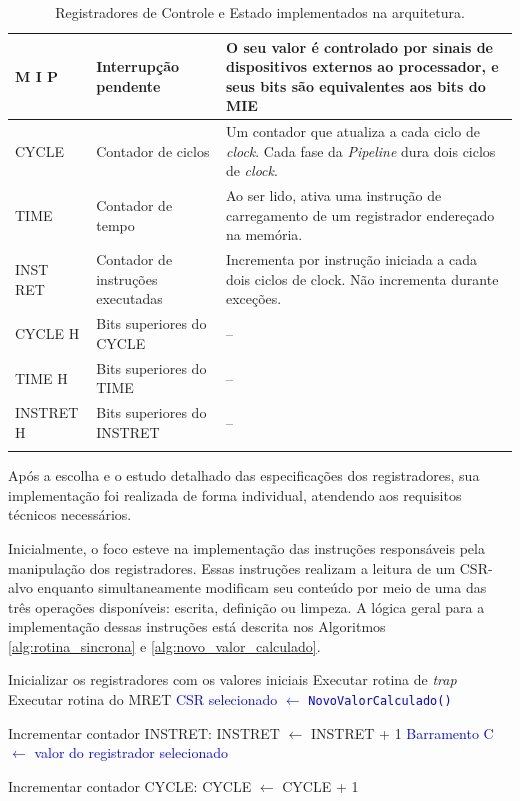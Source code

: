 \documentclass[
	12pt,				%
	openright,			%
	oneside,			%
	a4paper,			%
	english,			%
	french,				%
	spanish,			%
	brazil,				%
	]{abntex2}
\begin{document}
{\begin{longtable}{|p{3cm}|p{5cm}|p{8cm}|}
\hline
M I P & Interrupção pendente & O seu valor é controlado por sinais de dispositivos externos ao processador, e seus bits são equivalentes aos bits do MIE \\
\hline
CYCLE & Contador de ciclos & Um contador que atualiza a cada ciclo de \textit{clock}. Cada fase da \textit{Pipeline} dura dois ciclos de \textit{clock}. \\
\hline
TIME & Contador de tempo & Ao ser lido, ativa uma instrução de carregamento de um registrador endereçado na memória. \\
\hline
INST RET & Contador de instruções executadas & Incrementa por instrução iniciada a cada dois ciclos de clock. Não incrementa durante exceções. \\
\hline
CYCLE H & Bits superiores do CYCLE & -- \\
\hline
TIME H & Bits superiores do TIME & -- \\
\hline
INSTRET H & Bits superiores do INSTRET & -- \\ \hline
\captionsetup{width=1\textwidth}
\caption{Registradores de Controle e Estado implementados na arquitetura.}
\label{tab:registers}
\end{longtable}
}
Após a escolha e o estudo detalhado das especificações dos registradores, sua implementação foi realizada de forma individual, atendendo aos requisitos técnicos necessários.

Inicialmente, o foco esteve na implementação das instruções responsáveis pela manipulação dos registradores. Essas instruções realizam a leitura de um CSR-alvo enquanto simultaneamente modificam seu conteúdo por meio de uma das três operações disponíveis: escrita, definição ou limpeza. A lógica geral para a implementação dessas instruções está descrita nos Algoritmos \ref{alg:rotina_sincrona} e \ref{alg:novo_valor_calculado}.

\begin{algorithm}[h!]
\caption{Rotina Síncrona do Controlador de CSR}
\label{alg:rotina_sincrona}
\begin{algorithmic}[1]
        \STATE Inicializar os registradores com os valores iniciais
            \STATE Executar rotina de \textit{trap}
            \STATE Executar rotina do MRET
            \STATE \textcolor{blue}{CSR selecionado $\leftarrow$ \texttt{NovoValorCalculado()}}
        \ENDIF

            \STATE Incrementar contador INSTRET: INSTRET $\leftarrow$ INSTRET + 1
        \ENDIF
        \STATE \textcolor{blue}{Barramento C $\leftarrow$ valor do registrador selecionado}
    \ENDIF

        \STATE Incrementar contador CYCLE: CYCLE $\leftarrow$ CYCLE + 1
    \ENDIF
\end{algorithmic}
\end{algorithm}
\end{document}
